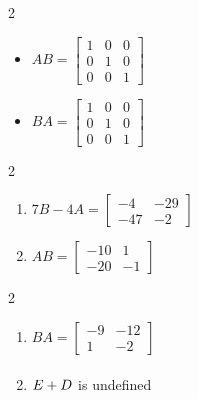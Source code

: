 \documentclass{ximera}
\begin{document}
\begin{enumerate}
\begin{multicols}{2}
\begin{itemize}
\item $AB =  \left[ \begin{array}{rrr} 1 & 0 & 0 \\ 0 & 1 & 0 \\ 0 & 0 & 1 \end{array} \right]$

\item $BA = \left[ \begin{array}{rrr} 1 & 0 & 0 \\ 0 & 1 & 0 \\ 0 & 0 & 1 \end{array} \right]$


\end{itemize}
\end{multicols}

	
\setcounter{HW}{\value{enumi}}
\end{enumerate}

\begin{multicols}{2} 
\begin{enumerate}
\setcounter{enumi}{\value{HW}}

\item $7B - 4A = \left[ \begin{array}{rr} -4 & -29 \\ -47 & -2 \end{array} \right]$
\item $AB = \left[ \begin{array}{rr} -10 & 1 \\ -20 & -1 \end{array} \right]$


\setcounter{HW}{\value{enumi}}
\end{enumerate}
\end{multicols}

\begin{multicols}{2} 
\begin{enumerate}
\setcounter{enumi}{\value{HW}}

\item $BA = \left[ \begin{array}{rr} -9 & -12 \\ 1 & -2 \end{array} \right]$
\item $E + D \vphantom{\left[ \begin{array}{rr} -9 & -12 \\ 1 & -2 \end{array} \right]}$ is undefined


\setcounter{HW}{\value{enumi}}
\end{enumerate}
\end{multicols}
\end{document}
